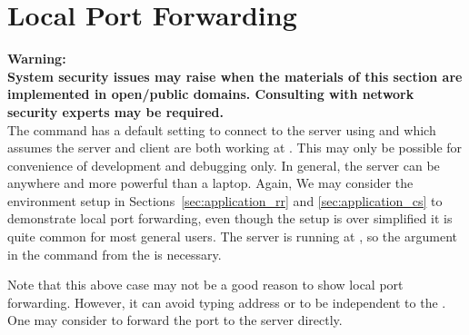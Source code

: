 \section[Local Port Forwarding]{Local Port Forwarding}
\label{sec:local_port_forwarding}

{\color{red} \bf Warning:\\
System security issues may raise when the materials of this section are
implemented in open/public domains. Consulting with network security experts
may be required.
}
\\

The  command  has a default setting
to connect to the  server using  and
 which assumes the  server and client are
both working at .
This may only be possible for convenience of development and debugging only.
In general, the server can be anywhere and more powerful than a laptop.
Again, We may consider the environment setup in
Sections~\ref{sec:application_rr} and \ref{sec:application_cs} to
demonstrate local port forwarding, even though the setup is over simplified
it is quite common for most general users.
The server is running at , so the argument
 in the 
command  from the 
is necessary.

Note that this above case may not be a good reason to show local port
forwarding.
However, it can avoid typing address or to be independent to the .
One may consider to forward the  port  to the
server directly.

